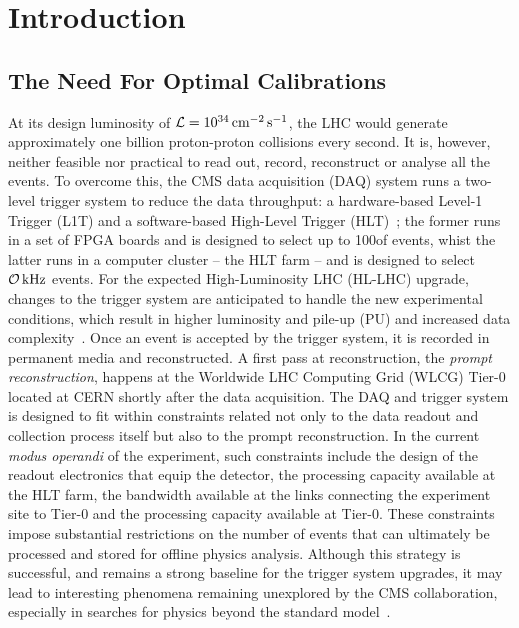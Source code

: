 \chapter{Introduction}

\section{The Need For Optimal Calibrations}
At its design luminosity of $\mathcal{L} = 10^{34}\,\text{cm}^{-2}\,\text{s}^{-1}$, the LHC would generate approximately one billion proton-proton collisions every second. It is, however, neither feasible nor practical to read out, record, reconstruct or analyse all the events. To overcome this, the CMS data acquisition (DAQ) system runs a two-level trigger system to reduce the data throughput: a hardware-based Level-1 Trigger (L1T) and a software-based High-Level Trigger (HLT)~\cite{CMS:2016ngn}; the former runs in a set of FPGA boards and is designed to select up to 100\kHz of events, whist the latter runs in a computer cluster -- the HLT farm -- and is designed to select $\mathcal{O}\,\text{kHz}$ events. For the expected High-Luminosity LHC (HL-LHC) upgrade, changes to the trigger system are anticipated to handle the new experimental conditions, which result in higher luminosity and pile-up (PU) and increased data complexity~\cite{Collaboration:2759072, CERN-LHCC-2020-004}. 
\newline \newline
Once an event is accepted by the trigger system, it is recorded in permanent media and reconstructed. A first pass at reconstruction, the \emph{prompt reconstruction}, happens at the Worldwide LHC Computing Grid (WLCG) Tier-0 located at CERN shortly after the data acquisition. The DAQ and trigger system is designed to fit within constraints related not only to the data readout and collection process itself but also to the prompt reconstruction.
\newline \newline
In the current \textit{modus operandi} of the experiment, such constraints include the design of the readout electronics that equip the detector, the processing capacity available at the HLT farm, the bandwidth available at the links connecting the experiment site to Tier-0 and the processing capacity available at Tier-0. These constraints impose substantial restrictions on the number of events that can ultimately be processed and stored for offline physics analysis. Although this strategy is successful, and remains a strong baseline for the trigger system upgrades, it may lead to interesting phenomena remaining unexplored by the CMS collaboration, especially in searches for physics beyond the standard model~\cite{cms_exotica_summary_plots}.
